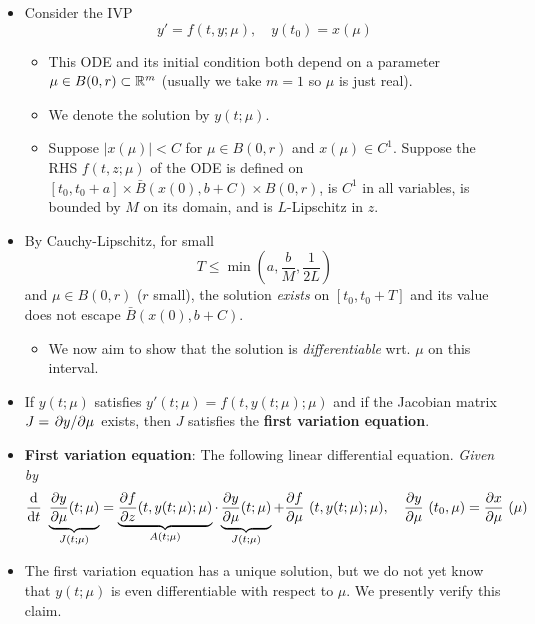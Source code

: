 \documentclass[../notes.tex]{subfiles}
\begin{document}
\begin{itemize}
\begin{itemize}
    \end{itemize}
    \item Consider the IVP
    \begin{equation*}
        y' = f(t,y;\mu)
        ,\quad
        y(t_0) = x(\mu)
    \end{equation*}
    \begin{itemize}
        \item This ODE and its initial condition both depend on a parameter $\mu\in B(0,r)\subset\mathbb{R}^m$ (usually we take $m=1$ so $\mu$ is just real).
        \item We denote the solution by $y(t;\mu)$.
        \item Suppose $|x(\mu)|<C$ for $\mu\in B(0,r)$ and $x(\mu)\in C^1$. Suppose the RHS $f(t,z;\mu)$ of the ODE is defined on $[t_0,t_0+a]\times\bar{B}(x(0),b+C)\times B(0,r)$, is $C^1$ in all variables, is bounded by $M$ on its domain, and is $L$-Lipschitz in $z$.
    \end{itemize}
    \item By Cauchy-Lipschitz, for small
    \begin{equation*}
        T \leq \min\left( a,\frac{b}{M},\frac{1}{2L} \right)
    \end{equation*}
    and $\mu\in B(0,r)$ ($r$ small), the solution \emph{exists} on $[t_0,t_0+T]$ and its value does not escape $\bar{B}(x(0),b+C)$.
    \begin{itemize}
        \item We now aim to show that the solution is \emph{differentiable} wrt. $\mu$ on this interval.
    \end{itemize}
    \item If $y(t;\mu)$ satisfies $y'(t;\mu)=f(t,y(t;\mu);\mu)$ and if the Jacobian matrix $J=\pdv*{y}{\mu}$ exists, then $J$ satisfies the \textbf{first variation equation}.
    \item \textbf{First variation equation}: The following linear differential equation. \emph{Given by}
    \begin{equation*}
        \dv{t}~\underbrace{{\pdv{y}{\mu}}(t;\mu)}_{J(t;\mu)} = \underbrace{{\pdv{f}{z}}(t,y(t;\mu);\mu)}_{A(t;\mu)}\cdot\underbrace{{\pdv{y}{\mu}}(t;\mu)}_{J(t;\mu)}+\pdv{f}{\mu}~(t,y(t;\mu);\mu)
        ,\quad
        \pdv{y}{\mu}~(t_0,\mu) = \pdv{x}{\mu}~(\mu)
    \end{equation*}
    \item The first variation equation has a unique solution, but we do not yet know that $y(t;\mu)$ is even differentiable with respect to $\mu$. We presently verify this claim.

\end{itemize}
\end{document}
